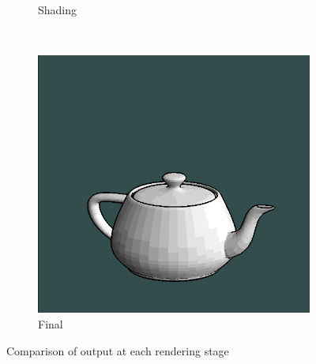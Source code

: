 \begin{figure}[h]
\begin{subfigure}[b]{0.2\textwidth}
        \caption{Shading}
        \label{fig:model-render}
    \end{subfigure}
    ~
    \begin{subfigure}[b]{0.2\textwidth}
        \includegraphics[width=\textwidth]{img/teapot-complete.png}
        \caption{Final}
        \label{fig:complete-render}
    \end{subfigure}
    \caption{Comparison of output at each rendering stage}
    \label{fig:teapot-comparison}
\end{figure}


